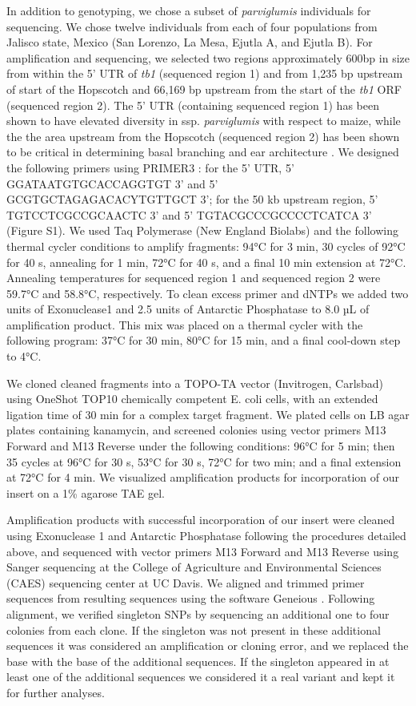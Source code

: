 \documentclass[12pt]{article}
\begin{document}
In addition to genotyping, we chose a subset of \emph{parviglumis} individuals for sequencing. We chose twelve individuals from each of four populations from Jalisco state, Mexico (San Lorenzo, La Mesa, Ejutla A, and Ejutla B). For amplification and sequencing, we selected two regions approximately 600bp in size from within the 5' UTR of \emph{tb1} (sequenced region 1) and from 1,235 bp upstream of start of the Hopscotch and 66,169 bp upstream from the start of the \emph{tb1} ORF (sequenced region 2). The 5' UTR (containing sequenced region 1) has been shown to have elevated diversity in ssp. \emph{parviglumis} with respect to maize, while the the area upstream from the Hopscotch (sequenced region 2) has been shown to be critical in determining basal branching and ear architecture \cite{Wang et al 1999, Clark et al 2006}. We designed the following primers using PRIMER3 \cite{Rozen and Skaletsky 2000}: for the 5' UTR, 5' GGATAATGTGCACCAGGTGT 3' and 5' GCGTGCTAGAGACACYTGTTGCT 3'; for the 50 kb upstream region, 5' TGTCCTCGCCGCAACTC 3' and 5' TGTACGCCCGCCCCTCATCA 3' (Figure S1). We used Taq Polymerase (New England Biolabs) and the following thermal cycler conditions to amplify fragments: 94°C for 3 min, 30 cycles of 92°C for 40 s, annealing for 1 min, 72°C for 40 s, and a final 10 min extension at 72°C. Annealing temperatures for sequenced region 1 and sequenced region 2 were 59.7°C and 58.8°C, respectively. To clean excess primer and dNTPs we added two units of Exonuclease1 and 2.5 units of Antarctic Phosphatase to 8.0 µL of amplification product. This mix was placed on a thermal cycler with the following program: 37°C for 30 min, 80°C for 15 min, and a final cool-down step to 4°C. 

We cloned cleaned fragments into a TOPO-TA vector (Invitrogen, Carlsbad) using OneShot TOP10 chemically competent E. coli cells, with an extended ligation time of 30 min for a complex target fragment. We plated cells on LB agar plates containing kanamycin, and screened colonies using vector primers M13 Forward and M13 Reverse under the following conditions: 96°C for 5 min; then 35 cycles at 96°C for 30 s, 53°C for 30 s, 72°C for two min; and a final extension at 72°C for 4 min. We visualized amplification products for incorporation of our insert on a 1\% agarose TAE gel.

Amplification products with successful incorporation of our insert were cleaned using Exonuclease 1 and Antarctic Phosphatase following the procedures detailed above, and sequenced with vector primers M13 Forward and M13 Reverse using Sanger sequencing at the College of Agriculture and Environmental Sciences (CAES) sequencing center at UC Davis. We aligned and trimmed primer sequences from resulting sequences using the software Geneious \cite{Kearse et al 2012}. Following alignment, we verified singleton SNPs by sequencing an additional one to four colonies from each clone. If the singleton was not present in these additional sequences it was considered an amplification or cloning error, and we replaced the base with the base of the additional sequences. If the singleton appeared in at least one of the additional sequences we considered it a real variant and kept it for further analyses. 
\end{document}
